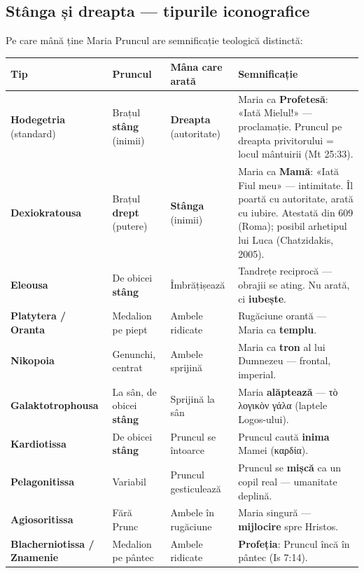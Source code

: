 \documentclass[12pt,a4paper,twoside,openany]{book}
\begin{document}
\subsection*{Stânga și dreapta --- tipurile iconografice}

Pe care mână ține Maria Pruncul are semnificație teologică distinctă:

\begin{center}
\footnotesize
\begin{tabular}{L{2.5cm}L{2cm}L{2cm}L{6cm}}
\toprule
{}
\textbf{Tip} & \textbf{Pruncul} & \textbf{Mâna care arată} & \textbf{Semnificație} \\
\midrule
\textbf{Hodegetria} (standard) & Brațul \textbf{stâng} (inimii) & \textbf{Dreapta} (autoritate) & Maria ca \textbf{Profetesă}: «Iată Mielul!» --- proclamație. Pruncul pe dreapta privitorului = locul mântuirii (Mt 25:33). \\
\textbf{Dexiokratousa} & Brațul \textbf{drept} (putere) & \textbf{Stânga} (inimii) & Maria ca \textbf{Mamă}: «Iată Fiul meu» --- intimitate. Îl poartă cu autoritate, arată cu iubire. Atestată din 609 (Roma); posibil arhetipul lui Luca (Chatzidakis, 2005). \\
\textbf{Eleousa} & De obicei \textbf{stâng} & Îmbrățișează & Tandrețe reciprocă --- obrajii se ating. Nu arată, ci \textbf{iubește}. \\
\textbf{Platytera / Oranta} & Medalion pe piept & Ambele ridicate & Rugăciune orantă --- Maria ca \textbf{templu}. \\
\textbf{Nikopoia} & Genunchi, centrat & Ambele sprijină & Maria ca \textbf{tron} al lui Dumnezeu --- frontal, imperial. \\
\textbf{Galaktotrophousa} & La sân, de obicei \textbf{stâng} & Sprijină la sân & Maria \textbf{alăptează} --- τὸ λογικὸν γάλα (laptele Logos-ului). \\
\textbf{Kardiotissa} & De obicei \textbf{stâng} & Pruncul se întoarce & Pruncul caută \textbf{inima} Mamei (καρδία). \\
\textbf{Pelagonitissa} & Variabil & Pruncul gesticulează & Pruncul se \textbf{mișcă} ca un copil real --- umanitate deplină. \\
\textbf{Agiosoritissa} & Fără Prunc & Ambele în rugăciune & Maria singură --- \textbf{mijlocire} spre Hristos. \\
\textbf{Blacherniotissa / Znamenie} & Medalion pe pântec & Ambele ridicate & \textbf{Profeția}: Pruncul încă în pântec (Is 7:14). \\
\bottomrule
\end{tabular}
\end{center}
\normalsize
\end{document}
